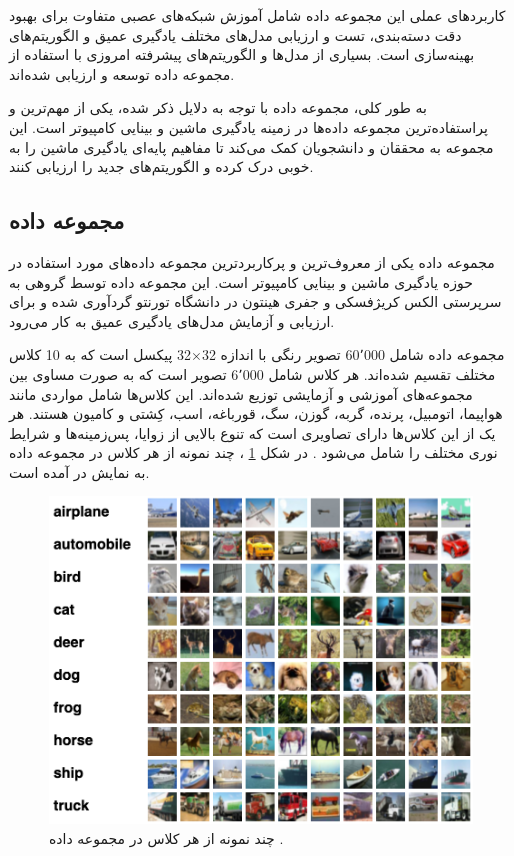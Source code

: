 کاربردهای عملی این مجموعه داده شامل آموزش شبکه‌های عصبی متفاوت برای بهبود دقت دسته‌بندی، تست و ارزیابی مدل‌های مختلف یادگیری عمیق و الگوریتم‌های بهینه‌سازی است. بسیاری از مدل‌ها و الگوریتم‌های پیشرفته امروزی با استفاده از مجموعه داده
توسعه و ارزیابی شده‌اند.

به طور کلی، مجموعه داده
با توجه به دلایل ذکر شده، یکی از مهم‌ترین و پراستفاده‌ترین مجموعه داده‌ها در زمینه یادگیری ماشین و بینایی کامپیوتر است. این مجموعه به محققان و دانشجویان کمک می‌کند تا مفاهیم پایه‌ای یادگیری ماشین را به خوبی درک کرده و الگوریتم‌های جدید را ارزیابی کنند.


\subsection{
	مجموعه داده
}
مجموعه داده
یکی از معروف‌ترین و پرکاربردترین مجموعه داده‌های مورد استفاده در حوزه یادگیری ماشین و بینایی کامپیوتر است. این مجموعه داده توسط گروهی به سرپرستی الکس کریژفسکی%
و جفری هینتون%
در دانشگاه تورنتو گردآوری شده و برای ارزیابی و آزمایش مدل‌های یادگیری عمیق به کار می‌رود.


مجموعه داده
شامل 60٬000 تصویر رنگی با اندازه
32$\times$32
پیکسل است که به 10 کلاس مختلف تقسیم شده‌اند. هر کلاس شامل 6٬000 تصویر است که به صورت مساوی بین مجموعه‌های آموزشی و آزمایشی توزیع شده‌اند. این کلاس‌ها شامل مواردی مانند هواپیما، اتومبیل، پرنده، گربه، گوزن، سگ، قورباغه، اسب، کِشتی و کامیون هستند. هر یک از این کلاس‌ها دارای تصاویری است که تنوع بالایی از زوایا، پس‌زمینه‌ها و شرایط نوری مختلف را شامل می‌شود
\cite{krizhevsky2009learning}.
در شکل
\ref{cifar10}%
، چند نمونه از هر کلاس در مجموعه داده
\mbox{}
به نمایش در آمده است.


\begin{figure}[t]
	\centering
	\includegraphics[scale=0.7]{images/chap5/cifar10.png}%
	\caption{%
		چند نمونه از هر کلاس در مجموعه داده
		\cite{Evan2022CIFAR10}.
	}
	\label{cifar10}
	\centering
\end{figure}




